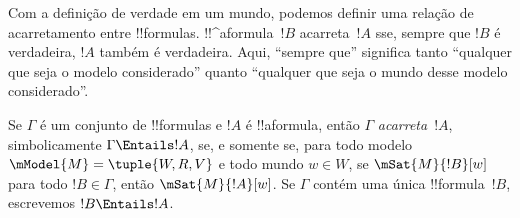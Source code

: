 \documentclass[../../../include/open-logic-section]{subfiles}
\begin{document}


\begin{explain}
  Com a definição de verdade em um mundo, podemos definir uma relação de
  acarretamento entre !!{formula}s. !!^a{formula}~$!B$ acarreta~$!A$ sse,
  sempre que $!B$ é verdadeira, $!A$ também é verdadeira. Aqui, ``sempre
  que'' significa tanto ``qualquer que seja o modelo considerado'' quanto
  ``qualquer que seja o mundo desse modelo considerado''.
\end{explain}

\begin{defn}
  Se $\Gamma$ é um conjunto de !!{formula}s e $!A$ é !!a{formula}, então
  $\Gamma$ \emph{acarreta}~$!A$, simbolicamente $\Gamma \Entails !A$,
  se, e somente se, para todo modelo $\mModel{M} = \tuple{W, R, V}$ e
  todo mundo $w \in W$, se $\mSat{M}{!B}[w]$ para todo $!B \in \Gamma$,
  então $\mSat{M}{!A}[w]$. Se $\Gamma$ contém uma única !!{formula}~$!B$,
  escrevemos $!B \Entails !A$.
\end{defn}
\end{document}

